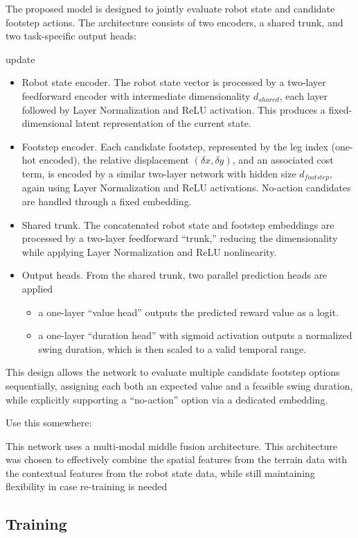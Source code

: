 The proposed model is designed to jointly evaluate robot state and
candidate footstep actions. The architecture consists of two
encoders, a shared trunk, and two task-specific output heads:
\begin{todo}
  update
\end{todo}
\begin{itemize}
  \item Robot state encoder. The robot state vector is processed by a
    two-layer feedforward encoder with intermediate dimensionality
    $d_{shared}$, each layer followed by Layer Normalization and ReLU
    activation.
    This produces a fixed-dimensional latent representation of the
    current state.
  \item Footstep encoder. Each candidate footstep, represented by the leg
    index (one-hot encoded), the relative displacement
    $(\delta x, \delta y)$, and an associated cost term, is encoded by a similar
    two-layer network with hidden size $d_{footstep}$, again using
    Layer Normalization and ReLU activations. No-action candidates are
    handled through a fixed embedding.
  \item Shared trunk. The concatenated robot state and footstep embeddings
    are processed by a two-layer feedforward “trunk,” reducing the
    dimensionality while applying Layer Normalization and ReLU nonlinearity.
  \item Output heads. From the shared trunk, two parallel prediction heads
    are applied

    \begin{itemize}
      \item a one-layer “value head” outputs the predicted reward
        value as a logit.
      \item a one-layer “duration head” with sigmoid activation
        outputs a normalized swing duration, which is then scaled to a
        valid temporal range.
    \end{itemize}
\end{itemize}

This design allows the network to evaluate multiple candidate
footstep options sequentially, assigning each both an expected value
and a feasible swing duration, while explicitly supporting a
“no-action” option via a dedicated embedding.

\begin{todo}
  Use this somewhere:

  This network uses a multi-modal middle fusion
  architecture. This architecture was chosen to effectively combine the
  spatial features from the terrain data with the contextual features
  from the robot state data, while still maintaining flexibility in
  case re-training is needed \cite{feng2021deep}
\end{todo}

\subsection{Training}
